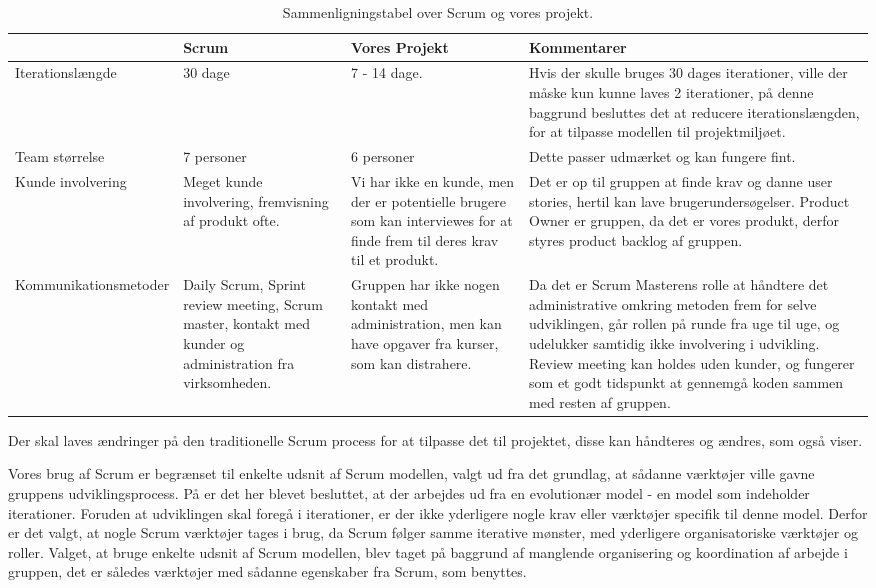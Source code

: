 \begin{sidewaystable}
      \begin{tabular}{p{5cm}p{5cm}p{5cm}p{5cm}}
	       				 & Scrum  & Vores Projekt & Kommentarer  \\ \hline

	   Iterationslængde  		
	   		& 30 dage 
	   		& 7 - 14 dage. 
	   		& Hvis der skulle bruges 30 dages iterationer, ville der måske kun kunne laves 2 iterationer, på denne baggrund besluttes det at reducere iterationslængden, for at tilpasse modellen til projektmiljøet.\\
	   		
	   Team størrelse    		
	   		& 7 personer
	   		& 6 personer 
	   		& Dette passer udmærket og kan fungere fint. \\
	   		
	   Kunde involvering 		
	   		& Meget kunde involvering, fremvisning af produkt ofte.
	   		& Vi har ikke en kunde, men der er potentielle brugere som kan interviewes for at finde frem til deres krav til et produkt.
	   		& Det er op til gruppen at finde krav og danne user stories, hertil kan lave brugerundersøgelser. Product Owner er gruppen, da det er vores produkt, derfor styres product backlog af gruppen.\\
	   		
	   Kommunikationsmetoder	
	   		& Daily Scrum, Sprint review meeting,  Scrum master, kontakt med kunder og administration fra virksomheden.
	   		& Gruppen har ikke nogen kontakt med administration, men kan have opgaver fra kurser, som kan distrahere. 
	   		& Da det er Scrum Masterens rolle at håndtere det administrative omkring metoden frem for selve udviklingen, går rollen på runde fra uge til uge, og udelukker samtidig ikke involvering i udvikling. Review meeting kan holdes uden kunder, og fungerer som et godt tidspunkt at gennemgå koden sammen med resten af gruppen. \\
    \end{tabular}
  \caption{Sammenligningstabel over Scrum og vores projekt.}\label{tabel:sammenligningstabel}
\end{sidewaystable}

Der skal laves ændringer på den traditionelle Scrum process for at tilpasse det til projektet, disse kan håndteres og ændres, som  også viser.

Vores brug af Scrum er begrænset til enkelte udsnit af Scrum modellen, valgt ud fra det grundlag, at sådanne værktøjer ville gavne gruppens udviklingsprocess.
På  er det her blevet besluttet, at der arbejdes ud fra en evolutionær model - en model som indeholder iterationer.
Foruden at udviklingen skal foregå i iterationer, er der ikke yderligere nogle krav eller værktøjer specifik til denne model.
Derfor er det valgt, at nogle Scrum værktøjer tages i brug, da Scrum følger samme iterative mønster, med yderligere organisatoriske værktøjer og roller.
Valget, at bruge enkelte udsnit af Scrum modellen, blev taget på baggrund af manglende organisering og koordination af arbejde i gruppen, det er således værktøjer med sådanne egenskaber fra Scrum, som benyttes.

